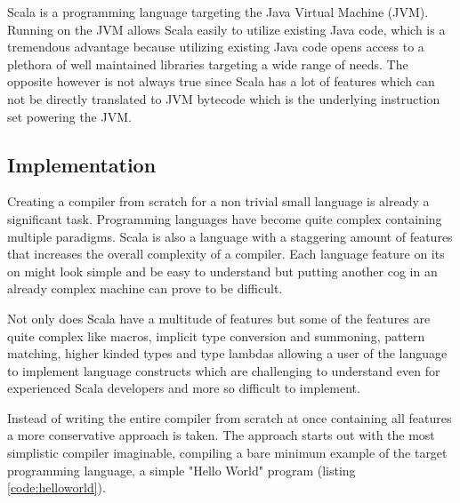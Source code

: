 \documentclass{VUMIFPSbakalaurinis}
\begin{document}
Scala is a programming language targeting the Java Virtual Machine (JVM).
Running on the JVM allows Scala easily to utilize existing Java code, which is a tremendous advantage because utilizing existing Java code opens access to a plethora of well maintained libraries targeting a wide range of needs.
The opposite however is not always true since Scala has a lot of features which can not be directly translated to JVM bytecode which is the underlying instruction set powering the JVM.

\subsection{Implementation}
Creating a compiler from scratch for a non trivial small language is already a significant task.
Programming languages have become quite complex containing multiple paradigms.
Scala is also a language with a staggering amount of features that increases the overall complexity of a compiler.
Each language feature on its on might look simple and be easy to understand but putting another cog in an already complex machine can prove to be difficult.

Not only does Scala have a multitude of features but some of the features are quite complex like macros, implicit type conversion and summoning, pattern matching, higher kinded types and type lambdas allowing a user of the language to implement language constructs \cite{Scala2Union, ShapelessGithub} which are challenging to understand even for experienced Scala developers and more so difficult to implement.


Instead of writing the entire compiler from scratch at once containing all features a more conservative approach is taken.
The approach starts out with the most simplistic compiler imaginable, compiling a bare minimum example of the target programming language, a simple "Hello World" program (listing \ref{code:helloworld}).


\end{document}
